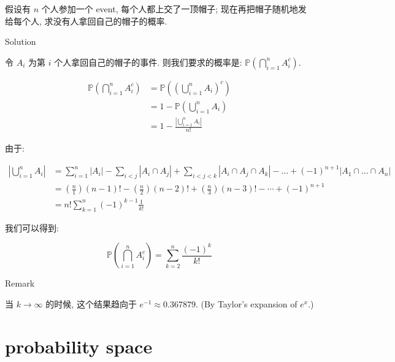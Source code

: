 \documentclass{qlnotes-export}
\begin{document}
\begin{example}

假设有 \(n\) 个人参加一个 event, 每个人都上交了一顶帽子; 现在再把帽子随机地发给每个人, 求没有人拿回自己的帽子的概率.

\begin{qlsolution}{Solution}

令 \(A_{i}\) 为第 \(i\) 个人拿回自己的帽子的事件. 则我们要求的概率是: \({\mathbb{P}}(\bigcap_{i = 1}^{n}A_{i}^{c})\).

\[\begin{matrix}
{{\mathbb{P}}(\bigcap\limits_{i = 1}^{n}A_{i}^{c})} & {= {\mathbb{P}}((\bigcup\limits_{i = 1}^{n}A_{i})^{c})} \\
 & {= 1 - {\mathbb{P}}(\bigcup\limits_{i = 1}^{n}A_{i})} \\
 & {= 1 - \frac{|\bigcup_{i = 1}^{n}A_{i}|}{n!}}
\end{matrix}\]

由于:

\[\begin{matrix}
{|\bigcup\limits_{i = 1}^{n}A_{i}|} & {= \sum\limits_{i = 1}^{n}\left| A_{i} \right| - \sum\limits_{i < j}\left| {A_{i} \cap A_{j}} \right| + \sum\limits_{i < j < k}\left| {A_{i} \cap A_{j} \cap A_{k}} \right| - \ldots + ( - 1)^{n + 1}\left| {A_{1} \cap \ldots \cap A_{n}} \right|} \\
 & {= \left( \frac{n}{1} \right)(n - 1)! - \left( \frac{n}{2} \right)(n - 2)! + \left( \frac{n}{3} \right)(n - 3)! - \cdots + ( - 1)^{n + 1}} \\
 & {= n!\sum\limits_{k = 1}^{n}( - 1)^{k - 1}\frac{1}{k!}}
\end{matrix}\]

我们可以得到:

\[{\mathbb{P}}(\bigcap\limits_{i = 1}^{n}A_{i}^{c}) = \sum\limits_{k = 2}^{n}\frac{( - 1)^{k}}{k!}\]

\end{qlsolution}

\end{example}

\begin{qlremark}{Remark}

当 \(k\rightarrow\infty\) 的时候, 这个结果趋向于 \(e^{- 1} \approx 0.367879\). (By Taylor's expansion of \(e^{x}\).)

\end{qlremark}

\section{probability space}\label{probability-space}
\end{document}
